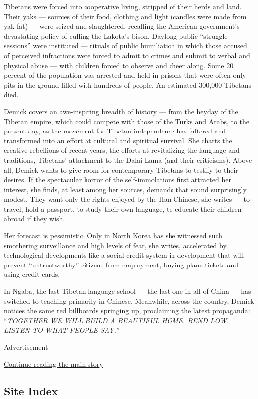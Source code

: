 Tibetans were forced into cooperative living, stripped of their herds
and land. Their yaks --- sources of their food, clothing and light
(candles were made from yak fat) --- were seized and slaughtered,
recalling the American government's devastating policy of culling the
Lakota's bison. Daylong public ``struggle sessions'' were instituted ---
rituals of public humiliation in which those accused of perceived
infractions were forced to admit to crimes and submit to verbal and
physical abuse --- with children forced to observe and cheer along. Some
20 percent of the population was arrested and held in prisons that were
often only pits in the ground filled with hundreds of people. An
estimated 300,000 Tibetans died.

Demick covers an awe-inspiring breadth of history --- from the heyday of
the Tibetan empire, which could compete with those of the Turks and
Arabs, to the present day, as the movement for Tibetan independence has
faltered and transformed into an effort at cultural and spiritual
survival. She charts the creative rebellions of recent years, the
efforts at revitalizing the language and traditions, Tibetans'
attachment to the Dalai Lama (and their criticisms). Above all, Demick
wants to give room for contemporary Tibetans to testify to their
desires. If the spectacular horror of the self-immolations first
attracted her interest, she finds, at least among her sources, demands
that sound surprisingly modest. They want only the rights enjoyed by the
Han Chinese, she writes --- to travel, hold a passport, to study their
own language, to educate their children abroad if they wish.

Her forecast is pessimistic. Only in North Korea has she witnessed such
smothering surveillance and high levels of fear, she writes, accelerated
by technological developments like a social credit system in development
that will prevent ``untrustworthy'' citizens from employment, buying
plane tickets and using credit cards.

In Ngaba, the last Tibetan-language school --- the last one in all of
China --- has switched to teaching primarily in Chinese. Meanwhile,
across the country, Demick notices the same red billboards springing up,
proclaiming the latest propaganda: ``\emph{TOGETHER WE WILL BUILD A
BEAUTIFUL HOME. BEND LOW. LISTEN TO WHAT PEOPLE SAY.''}

Advertisement

\protect\hyperlink{after-bottom}{Continue reading the main story}

\hypertarget{site-index}{%
\subsection{Site Index}\label{site-index}}

